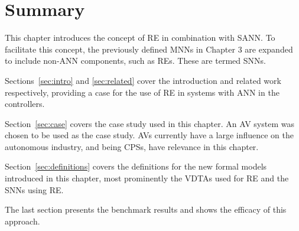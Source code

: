 \section{Summary}
This chapter introduces the concept of \acf{RE} in combination with \acf{SANN}.
To facilitate this concept, the previously defined \acfp{MNN} in Chapter 3 are expanded to include non-\ac{ANN} components, such as \acp{RE}.
These are termed \acfp{SNN}.

Sections~\ref{sec:intro} and \ref{sec:related} cover the introduction and related work respectively, providing a case for the use of \ac{RE} in systems with \ac{ANN} in the controllers.

Section~\ref{sec:case} covers the case study used in this chapter.
An \acf{AV} system was chosen to be used as the case study.
\acp{AV} currently have a large influence on the autonomous industry, and being \acfp{CPS}, have relevance in this chapter.

Section~\ref{sec:definitions} covers the definitions for the new formal models introduced in this chapter, most prominently the \acfp{VDTA} used for \ac{RE} and the \acp{SNN} using \ac{RE}.

The last section presents the benchmark results and shows the efficacy of this approach.

